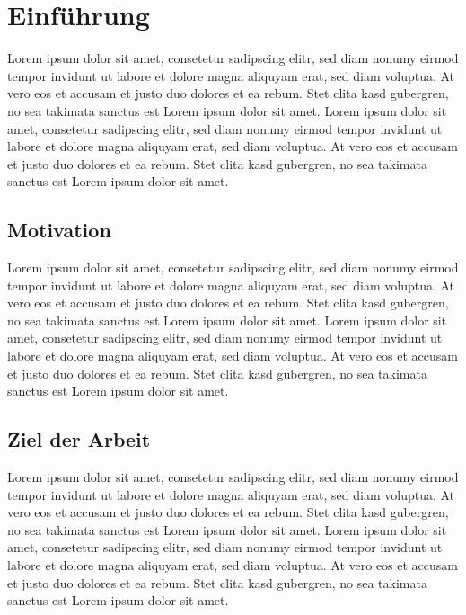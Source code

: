 
\chapter{Einführung}
\label{chap:introduction}

Lorem ipsum dolor sit amet, consetetur sadipscing elitr, sed diam nonumy eirmod
tempor invidunt ut labore et dolore magna aliquyam erat, sed diam voluptua.
At vero eos et accusam et justo duo dolores et ea rebum. Stet clita kasd gubergren,
no sea takimata sanctus est Lorem ipsum dolor sit amet. Lorem ipsum dolor sit amet,
consetetur sadipscing elitr, sed diam nonumy eirmod tempor invidunt ut
labore et dolore magna aliquyam erat, sed diam voluptua. At vero eos et accusam et
justo duo dolores et ea rebum. Stet clita kasd gubergren, no sea takimata sanctus est Lorem ipsum dolor sit amet.


\section{Motivation}

Lorem ipsum dolor sit amet, consetetur sadipscing elitr, sed diam nonumy eirmod
tempor invidunt ut labore et dolore magna aliquyam erat, sed diam voluptua.
At vero eos et accusam et justo duo dolores et ea rebum. Stet clita kasd gubergren,
no sea takimata sanctus est Lorem ipsum dolor sit amet. Lorem ipsum dolor sit amet,
consetetur sadipscing elitr, sed diam nonumy eirmod tempor invidunt ut labore et dolore magna aliquyam erat, sed diam voluptua. At vero eos et accusam et justo duo dolores et ea rebum. Stet clita kasd gubergren, no sea takimata sanctus est Lorem ipsum dolor sit amet.

\section{Ziel der Arbeit}
Lorem ipsum dolor sit amet, consetetur sadipscing elitr, sed diam nonumy eirmod
tempor invidunt ut labore et dolore magna aliquyam erat, sed diam voluptua. At vero eos et accusam et justo duo dolores et ea rebum. Stet clita kasd gubergren, no sea takimata sanctus est Lorem ipsum dolor sit amet. Lorem ipsum dolor sit amet, consetetur sadipscing elitr, sed diam nonumy eirmod tempor invidunt ut labore et dolore magna aliquyam erat, sed diam voluptua. At vero eos et accusam et justo duo dolores et ea rebum. Stet clita kasd gubergren, no sea takimata sanctus est Lorem ipsum dolor sit amet.

